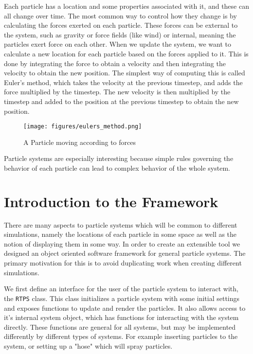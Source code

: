 Each particle has a location and some properties associated with it, and these
can all change over time. The most common way to control how they change is by
calculating the forces exerted on each particle. These forces can be external
to the system, such as gravity or force fields (like wind) or internal, meaning
the particles exert force on each other. When we update the system, we want to
calculate a new location for each particle based on the forces applied to it.
This is done by integrating the force to obtain a velocity and then integrating
the velocity to obtain the new position.
The simplest way of computing this is called Euler's method, which takes the
velocity at the previous timestep, and adds the force multiplied by the
timestep. The new velocity is then multiplied by the timestep and added to the
position at the previous timestep to obtain the new position.
\begin{figure}[!htc]
 		\centering
		\texttt{[image: figures/eulers\_method.png]}
		\label{fig:logic}
        \caption{ A Particle moving according to forces }
\end{figure}


Particle systems are especially interesting because simple rules governing the behavior of
each particle can lead to complex behavior of the whole system. 




\section{Introduction to the Framework}

There are many aspects to particle systems which will be common to different
simulations, namely the locations of each particle in some space as well as the
notion of displaying them in some way. In order to create an extensible tool we
designed an object oriented software framework for general particle systems.
The primary motivation for this is to avoid duplicating work when creating
different simulations.


We first define an interface for the user of the particle system to interact
with, the \verb|RTPS| class. This class initializes a particle system with some
initial settings and exposes functions to update and render the particles. It
also allows access to it's internal system object, which has functions for
interacting with the system directly. These functions are general for all
systems, but may be implemented differently by different types of systems. For
example inserting particles to the system, or setting up a "hose" which will
spray particles.


